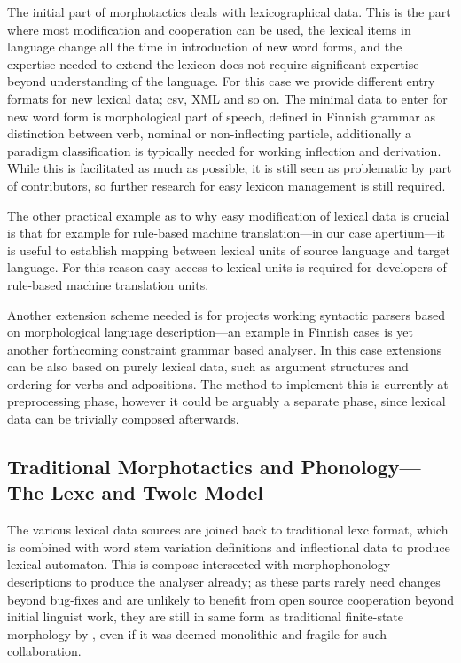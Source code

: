 \documentclass[11pt]{article}
\begin{document}
The initial part of morphotactics deals with lexicographical data. This is
the part where most modification and cooperation can be used, the lexical items
in language change all the time in introduction of new word forms, and the
expertise needed to extend the lexicon does not require significant expertise
beyond understanding of the language. For this case we provide different entry
formats for new lexical data; csv, XML and so on. The minimal data to enter for
new word form is morphological part of speech, defined in Finnish grammar
as distinction between verb, nominal or non-inflecting particle, additionally a
paradigm classification is typically needed for working inflection and
derivation. While this is facilitated as much as possible, it is still seen as
problematic by part of contributors, so further research for easy lexicon
management is still required.

The other practical example as to why easy modification of lexical data is
crucial is that for example for rule-based machine translation---in our case
apertium---it is useful to establish mapping between lexical units of source
language and target language. For this reason easy access to lexical units
is required for developers of rule-based machine translation units.

Another extension scheme needed is for projects working syntactic parsers based
on morphological language description---an example in Finnish
cases is yet another forthcoming constraint grammar\cite{karlsson/1990} based
analyser. In this case extensions can be also based on purely lexical data,
such as argument structures and ordering for verbs and adpositions. The method
to implement this is currently at preprocessing phase, however it could be
arguably a separate phase, since lexical data can be trivially composed
afterwards.

\subsection{Traditional Morphotactics and Phonology---The Lexc and Twolc Model}

The various lexical data sources are joined back to traditional lexc format,
which is combined with word stem variation definitions and inflectional data to
produce lexical automaton. This is compose-intersected with morphophonology
descriptions to produce the analyser already; as these parts rarely need
changes beyond bug-fixes and are unlikely to benefit from open source
cooperation beyond initial linguist work, they are still in same form as
traditional finite-state morphology by , even if it was
deemed monolithic and fragile for such collaboration.
\end{document}
